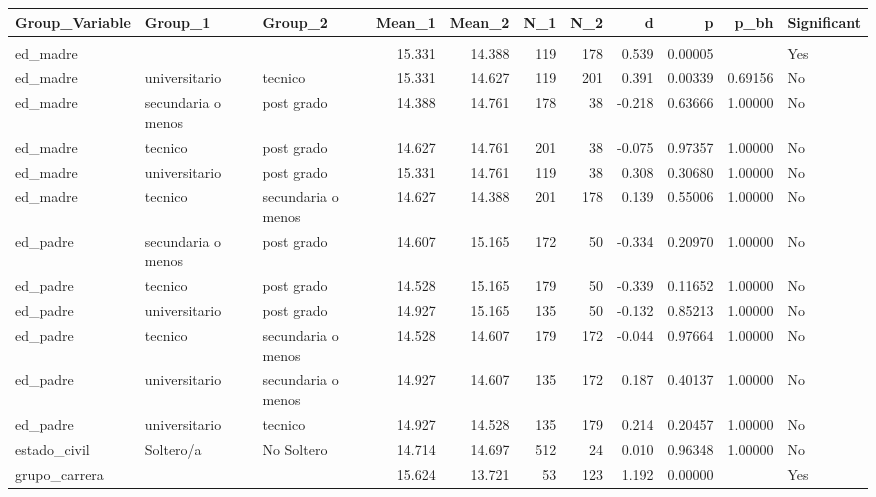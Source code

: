 \documentclass[
  letterpaper,
  DIV=11,
  numbers=noendperiod]{scrartcl}
\begin{document}
\begin{table}
\fontsize{12.0pt}{14.4pt}\selectfont
\begin{tabular*}{\linewidth}{@{\extracolsep{\fill}}lllrrrrrrrl}
\toprule
Group\_Variable & Group\_1 & Group\_2 & Mean\_1 & Mean\_2 & N\_1 & N\_2 & d & p & p\_bh & Significant \\ 
\midrule\addlinespace[2.5pt]
\multicolumn{11}{l}{promedio} \\[2.5pt] 
\midrule\addlinespace[2.5pt]
ed\_madre & {\cellcolor[HTML]{90EE90}{universitario}} & {\cellcolor[HTML]{90EE90}{secundaria o menos}} & 15.331 & 14.388 & 119 & 178 & 0.539 & 0.00005 & {\cellcolor[HTML]{90EE90}{0.01020}} & Yes \\ 
ed\_madre & universitario & tecnico & 15.331 & 14.627 & 119 & 201 & 0.391 & 0.00339 & 0.69156 & No \\ 
ed\_madre & secundaria o menos & post grado & 14.388 & 14.761 & 178 & 38 & -0.218 & 0.63666 & 1.00000 & No \\ 
ed\_madre & tecnico & post grado & 14.627 & 14.761 & 201 & 38 & -0.075 & 0.97357 & 1.00000 & No \\ 
ed\_madre & universitario & post grado & 15.331 & 14.761 & 119 & 38 & 0.308 & 0.30680 & 1.00000 & No \\ 
ed\_madre & tecnico & secundaria o menos & 14.627 & 14.388 & 201 & 178 & 0.139 & 0.55006 & 1.00000 & No \\ 
ed\_padre & secundaria o menos & post grado & 14.607 & 15.165 & 172 & 50 & -0.334 & 0.20970 & 1.00000 & No \\ 
ed\_padre & tecnico & post grado & 14.528 & 15.165 & 179 & 50 & -0.339 & 0.11652 & 1.00000 & No \\ 
ed\_padre & universitario & post grado & 14.927 & 15.165 & 135 & 50 & -0.132 & 0.85213 & 1.00000 & No \\ 
ed\_padre & tecnico & secundaria o menos & 14.528 & 14.607 & 179 & 172 & -0.044 & 0.97664 & 1.00000 & No \\ 
ed\_padre & universitario & secundaria o menos & 14.927 & 14.607 & 135 & 172 & 0.187 & 0.40137 & 1.00000 & No \\ 
ed\_padre & universitario & tecnico & 14.927 & 14.528 & 135 & 179 & 0.214 & 0.20457 & 1.00000 & No \\ 
estado\_civil & Soltero/a & No Soltero & 14.714 & 14.697 & 512 & 24 & 0.010 & 0.96348 & 1.00000 & No \\ 
grupo\_carrera & {\cellcolor[HTML]{90EE90}{humanidades}} & {\cellcolor[HTML]{90EE90}{gestion}} & 15.624 & 13.721 & 53 & 123 & 1.192 & 0.00000 & {\cellcolor[HTML]{90EE90}{0.00000}} & Yes \\ 

\end{tabular*}
\end{table}
\end{document}
